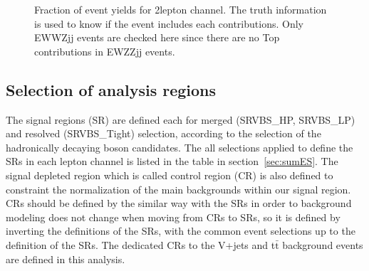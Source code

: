 \begin{figure}[H]
    \centering
        \caption{Fraction of event yields for 2lepton channel. The truth information is used to know if the event includes each contributions. Only EWWZjj events are checked here since there are no Top contributions in EWZZjj events.}
        \label{fig:TruthTop2LepPurity}
\end{figure}

\subsection{Selection of analysis regions}
The signal regions (SR) are defined each for merged (SRVBS\_HP, SRVBS\_LP) and resolved (SRVBS\_Tight) selection, according to the selection of the hadronically decaying boson candidates. The all selections applied to define the SRs in each lepton channel is listed in the table in section~\ref{sec:sumES}.
The signal depleted region which is called control region (CR) is also defined to constraint the normalization of the main backgrounds within our signal region. 
CRs should be defined by the similar way with the SRs in order to background modeling does not change when moving from CRs to SRs, so it is defined by inverting the definitions of the SRs, with the common event selections up to the definition of the SRs.
The dedicated CRs to the V+jets and t$\bar{\mathrm{t}}$ background events are defined in this analysis. \\ \\

